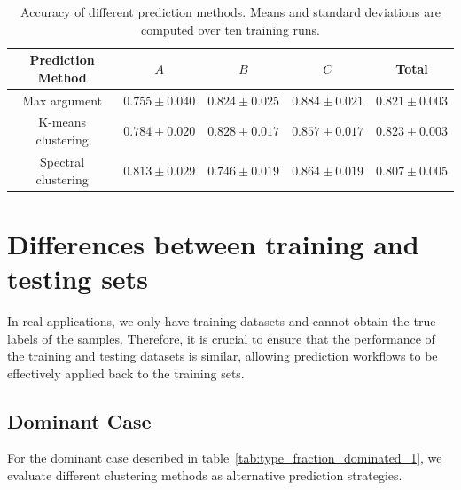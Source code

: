 \documentclass[12pt]{article}
\begin{document}
        \begin{table}[htpb]  
            \centering  
            \caption{Accuracy of different prediction methods. Means and standard deviations are computed over ten training runs.}  
            \label{tab:accuracy_w_different_prediction_dominated_1}  
            \begin{tabular}{c|ccc|c}  
                Prediction Method   & $A$               & $B$               & $C$               & Total             \\ \hline  
                Max argument        & $0.755 \pm 0.040$ & $0.824 \pm 0.025$ & $0.884 \pm 0.021$ & $0.821 \pm 0.003$ \\  
                K-means clustering  & $0.784 \pm 0.020$ & $0.828 \pm 0.017$ & $0.857 \pm 0.017$ & $0.823 \pm 0.003$ \\  
                Spectral clustering & $0.813 \pm 0.029$ & $0.746 \pm 0.019$ & $0.864 \pm 0.019$ & $0.807 \pm 0.005$  
            \end{tabular}  
        \end{table}  
\section{Differences between training and testing sets}%
\label{sec:differences_between_training_and_testing_sets}
    In real applications, we only have training datasets and cannot obtain the true labels of the samples. Therefore, it is crucial to ensure that the performance of the training and testing datasets is similar, allowing prediction workflows to be effectively applied back to the training sets.

    \subsection{Dominant Case}%
    \label{sub:dominated_case_train_test_comparison}
        For the dominant case described in table~\ref{tab:type_fraction_dominated_1}, we evaluate different clustering methods as alternative prediction strategies.  
\end{document}

